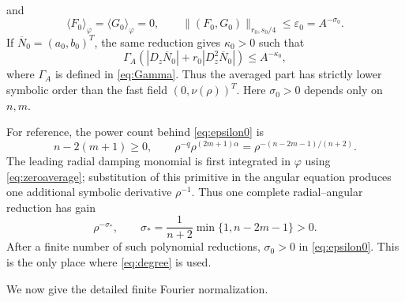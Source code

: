 \documentclass[11pt]{amsart}
\theoremstyle{remark}
\newcommand{\eps}{\varepsilon}
\newcommand{\av}[1]{\langle #1\rangle}
\newcommand{\norm}[1]{\lVert #1\rVert}
\begin{document}
and
\begin{equation}\label{eq:epsilon0}
 \av{F_0}_{\varphi}=\av{G_0}_{\varphi}=0,\qquad
 \norm{(F_0,G_0)}_{r_0,s_0/4}\leq
 \eps_0=A^{-\sigma_0}.
\end{equation}
If $\overline N_0=(a_0,b_0)^T$, the same reduction gives
$\kappa_0>0$ such that
\begin{equation}\label{eq:averageTame}
 \Gamma_A\left(
 |D_z\overline N_0|+
 r_0|D_z^2\overline N_0|
 \right)\leq A^{-\kappa_0},
\end{equation}
where $\Gamma_A$ is defined in \eqref{eq:Gamma}.  Thus the averaged part
has strictly lower symbolic order than the fast field $(0,\nu(\rho))^T$.
Here $\sigma_0>0$ depends only on $n,m$.

For reference, the power count behind \eqref{eq:epsilon0} is
\begin{equation}\label{eq:powercount}
 n-2(m+1)\geq0,\qquad
 \rho^{-q}\rho^{(2m+1)\alpha}
 =\rho^{-(n-2m-1)/(n+2)}.
\end{equation}
The leading radial damping monomial is first integrated in $\varphi$ using
\eqref{eq:zeroaverage}; substitution of this primitive in the angular
equation produces one additional symbolic derivative $\rho^{-1}$.  Thus
one complete radial--angular reduction has gain
\begin{equation}\label{eq:sigmagain}
 \rho^{-\sigma_*},\qquad
 \sigma_*=\frac1{n+2}
 \min\{1,n-2m-1\}>0.
\end{equation}
After a finite number of such polynomial reductions,
$\sigma_0>0$ in \eqref{eq:epsilon0}.  This is the only place where
\eqref{eq:degree} is used.

We now give the detailed finite Fourier normalization.
\end{document}
